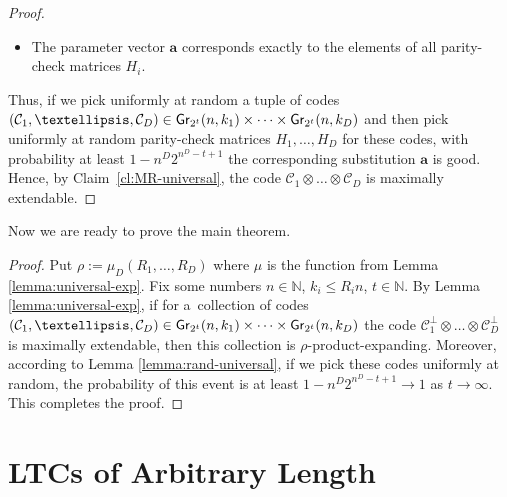 \documentclass[conference]{IEEEtran}
\newcommand{\rbr}[1]{\left(#1\right)}
\let\le\leqslant
\let\ge\geqslant
\theoremstyle{plain}
\theoremstyle{definition}
\theoremstyle{remark}
\newcommand{\NN}{\mathbb{N}}
\newcommand{\va}{\mathbf{a}}
\newcommand{\cC}{\mathcal{C}}
\newcommand{\Gr}{{\sf Gr}}
\newcommand{\PP}{\mathsf{P}}
\begin{document}
\begin{proof}
\begin{itemize}
\begin{multline*}
        \ge \PP\rbr{\va\in  U(2^t)}\ge 1 - n^D 2^{n^D - t + 1}.
    \end{multline*}
    \item The parameter vector $\va$ corresponds exactly to the elements of all parity-check matrices $H_i$.
 \end{itemize}
 Thus, if we pick uniformly at random a tuple of codes $(\cC_1,\dots,\cC_D)\in\Gr_{2^t}(n,k_1)\times\cdots\times\Gr_{2^t}(n,k_D)$ and then pick uniformly at random parity-check matrices $H_1,\dots,H_D$ for these codes, with probability at least $1 - n^D 2^{n^D - t + 1}$ the corresponding substitution $\va$ is good. Hence, by Claim~\ref{cl:MR-universal}, the code $\cC_1\otimes\dots \otimes \cC_D$ is maximally extendable.
\end{proof}

Now we are ready to prove the main theorem.
\ThMain*
\begin{proof}
   Put $\rho:=\mu_D(R_1,\dots,R_D)$ where $\mu$ is the function from Lemma \ref{lemma:universal-exp}.
   Fix some numbers $n\in\NN$, $k_i\le R_i n$, $t\in\NN$. 
   By Lemma \ref{lemma:universal-exp}, if for a~collection of codes $(\cC_1,\dots,\cC_D)\in\Gr_{2^t}(n,k_1)\times\cdots\times\Gr_{2^t}(n,k_D)$ the code $\cC_1^\perp\otimes\dots\otimes\cC_D^\perp$ is maximally extendable, then this collection is $\rho$-product-expanding. 
   Moreover, according to Lemma \ref{lemma:rand-universal}, if we pick these codes uniformly at random, the probability of this event is at least $1- n^D 2^{n^D - t + 1}\to 1$ as $t\to\infty$. 
   This completes the proof.
\end{proof}






\appendix

\section{LTCs of Arbitrary Length}\label{ap:LTC}
\end{document}

